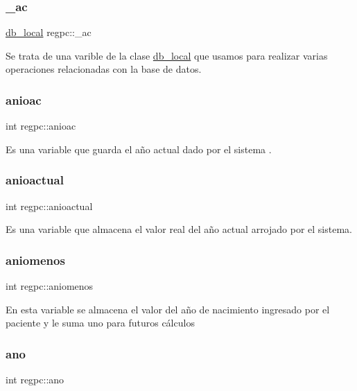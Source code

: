 \subsubsection{\texorpdfstring{\+\_\+ac}{\_ac}}
{\footnotesize\ttfamily \hyperlink{classdb__local}{db\+\_\+local} regpc\+::\+\_\+ac}

Se trata de una varible de la clase \hyperlink{classdb__local}{db\+\_\+local} que usamos para realizar varias operaciones relacionadas con la base de datos. \mbox{\label{classregpc_a30dcf993ad2a2c2b4dff62753376e42f}} 
\subsubsection{\texorpdfstring{anioac}{anioac}}
{\footnotesize\ttfamily int regpc\+::anioac}

Es una variable que guarda el año actual dado por el sistema . \mbox{\label{classregpc_a230854b12d5c6be4af761d70580bd96d}} 
\subsubsection{\texorpdfstring{anioactual}{anioactual}}
{\footnotesize\ttfamily int regpc\+::anioactual}

Es una variable que almacena el valor real del año actual arrojado por el sistema. \mbox{\label{classregpc_abc23efe29a835935e3ec385a0259646e}} 
\subsubsection{\texorpdfstring{aniomenos}{aniomenos}}
{\footnotesize\ttfamily int regpc\+::aniomenos}

En esta variable se almacena el valor del año de nacimiento ingresado por el paciente y le suma uno para futuros cálculos \mbox{\label{classregpc_adab18fcfafb988836d4e33a4a3e840fa}} 
\subsubsection{\texorpdfstring{ano}{ano}}
{\footnotesize\ttfamily int regpc\+::ano}

